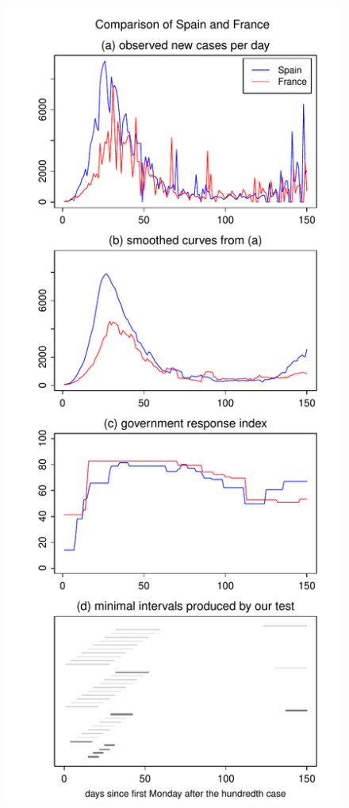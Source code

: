 \documentclass[a4paper,12pt]{article}
\numberwithin{equation}{section}
\begin{document}
\begin{figure}[h!]
\begin{minipage}[t]{0.49\textwidth}
\includegraphics[width=\textwidth]{plots/ESP_vs_FRA_Monday}

\end{minipage}
\end{figure}
\end{document}
